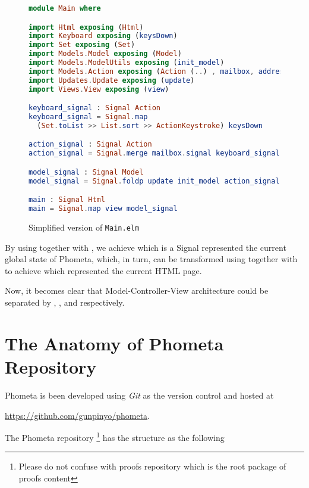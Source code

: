 \documentclass[master.tex]{subfiles}
\begin{document}
\begin{figure}[H]
\begin{framed}
\begin{lstlisting}[language=elm]
module Main where

import Html exposing (Html)
import Keyboard exposing (keysDown)
import Set exposing (Set)
import Models.Model exposing (Model)
import Models.ModelUtils exposing (init_model)
import Models.Action exposing (Action (..) , mailbox, address)
import Updates.Update exposing (update)
import Views.View exposing (view)

keyboard_signal : Signal Action
keyboard_signal = Signal.map
  (Set.toList >> List.sort >> ActionKeystroke) keysDown

action_signal : Signal Action
action_signal = Signal.merge mailbox.signal keyboard_signal

model_signal : Signal Model
model_signal = Signal.foldp update init_model action_signal

main : Signal Html
main = Signal.map view model_signal
\end{lstlisting}
\end{framed}
\caption{Simplified version of \texttt{Main.elm}}
\label{fig:implementation-simplified-main}
\end{figure}

By using  together with , we achieve  which is a Signal represented the
current global state of Phometa, which, in turn, can be transformed using
 together with  to achieve
 which represented the current HTML page.

Now, it becomes clear that Model-Controller-View architecture could be separated
by , , and  respectively.

\newpage

\section{The Anatomy of Phometa Repository}

Phometa is been developed using \emph{Git} as the version control and hosted
at

\url{https://github.com/gunpinyo/phometa}.

The Phometa repository \footnote{Please do not confuse with proofs repository
  which is the root package of proofs content} has the structure as the
following
\end{document}
